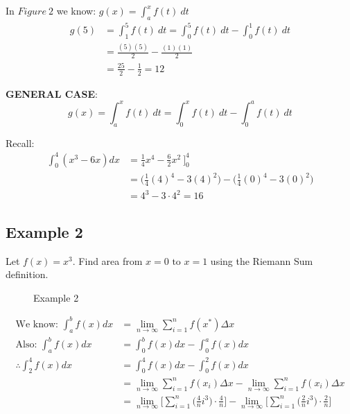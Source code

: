 \documentclass[11pt]{article}
\begin{document}
In $Figure\ 2$ we know: $\displaystyle{g(x)=\int_{a}^{x}f(t)\ dt}$\\
\begin{align*}
    g(5)&=\int_{1}^{5}f(t)\ dt=\int_{0}^{5}f(t)\ dt-\int_{0}^{1}f(t)\ dt\\
    &=\frac{(5)(5)}{2}-\frac{(1)(1)}{2}\\
    &=\frac{25}{2}-\frac{1}{2}=12
\end{align*}

\textbf{GENERAL CASE}: \[
    g(x)=\int_{a}^{x}f(t)\ dt=\int_{0}^{x}f(t)\ dt-\int_{0}^{a}f(t)\ dt
\]

Recall:
\begin{align*}
    \int_{0}^{4}(x^3-6x)dx&=\frac{1}{4}x^4-\frac{6}{2}x^2\ \bigg]_0^4\\
    &=\Big(\frac{1}{4}(4)^4-3(4)^2\Big)-\Big(\frac{1}{4}(0)^4-3(0)^2\Big)\\
    &=4^3-3\cdot4^2=16
\end{align*}

\pagebreak
\subsection{Example 2}
Let $f(x)=x^3$. Find area from $x=0 \text{ to } x=1$ using the Riemann Sum definition.
\begin{figure}[h]
    \centering
    \caption{Example 2}
\end{figure}

\begin{align*}
    \text{We know: }\int_{a}^{b}f(x)dx&=\lim_{n\to\infty}\sum_{i=1}^{n}f(x^*)\Delta x\\
    \text{Also: }\int_{a}^{b}f(x)dx&=\int_{0}^{b}f(x)dx-\int_{0}^{a}f(x)dx\\
    \therefore \int_{2}^{4}f(x)dx&=\int_{0}^{4}f(x)dx-\int_{0}^{2}f(x)dx\\
    &=\lim_{n\to\infty}\sum_{i=1}^{n}f(x_i)\Delta x - \lim_{n\to\infty}\sum_{i=1}^{n}f(x_i)\Delta x\\
    &=\lim_{n\to\infty}\Big[\sum_{i=1}^{n}\Big(\frac{4}{n}i^3\Big)\cdot \frac{4}{n}\Big]-\lim_{n\to\infty}\Big[\sum_{i=1}^{n}\Big(\frac{2}{n}i^3\Big)\cdot \frac{2}{n}\Big]
\end{align*}
\end{document}
